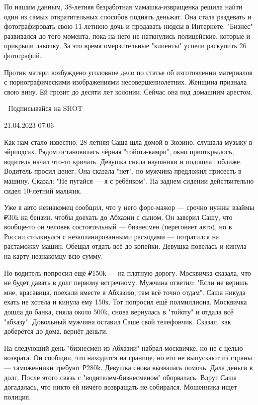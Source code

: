 \documentclass{article}
\begin{document}
\begin{multicols}{3}
По нашим данным, 38-летняя безработная мамашка-извращенка решила найти один из самых отвратительных способов поднять деньжат. Она стала раздевать и фотографировать свою 11-летнюю дочь и продавать нюдсы в Интернете. "Бизнес" развивался до того момента, пока на него не наткнулись полицейские, которые и прикрыли лавочку. За это время омерзительные "клиенты" успели раскупить 26 фотографий.

Против матери возбуждено уголовное дело по статье об изготовлении материалов с порнографическими изображениями несовершеннолетних. Женщина признала свою вину. Ей грозит до десяти лет колонии. Сейчас она под домашним арестом.

🎯 Подписывайся на SHOT

21.04.2023 07:06\closearticle
{}


Как нам стало известно, 28-летняя Саша шла домой в Зюзино, слушала музыку в эйрподсах. Рядом остановилась чёрная "тойота-камри", окно приоткрылось, водитель начал что-то кричать. Девушка сняла наушники и подошла поближе. Водитель просил денег. Она сказала "нет", но мужчина предложил присесть в машину. Сказал: "Не пугайся — я с ребёнком". На заднем сидении действительно сидел 10-летний мальчик. 

Уже в авто незнакомец сообщил, что у него форс-мажор — срочно нужны взаймы ₽30k на бензин, чтобы доехать до Абхазии с сыном. Он заверил Сашу, что вообще-то он человек состоятельный — бизнесмен (перегоняет авто), но в России столкнулся с незапланированными расходами — потратился на растаможку машин. Обещал отдать всё до копейки. Девушка повелась и кинула на карту незнакомцу всю сумму.

Но водитель попросил ещё ₽150k — на платную дорогу. Москвичка сказала, что не будет давать в долг первому встречному. Мужчина ответил: "Если не веришь мне, красавица, поехали вместе в Абхазию, там всё точно отдам". Саша никуда ехать не хотела и кинула ему 150к. Тот попросил ещё полмиллиона. Москвичка дошла до банка, сняла около 500k, снова вернулась в "тойоту" и отдала всё "абхазу". Довольный мужчина оставил Саше свой телефончик. Сказал, как доберётся до дома, вернёт деньги. 

На следующий день "бизнесмен из Абхазии" набрал москвичке, но не с целью возврата. Он сообщил, что находится на границе, но его не выпускают из страны — таможенники требуют ₽280k. Девушка снова вызвалась помочь. Дала деньги в долг. После этого связь с "водителем-бизнесменом" оборвалась. Вдруг Саша догадалась, что никто ей ничего возвращать не собирался. Мошенника ищет полиция.


\end{multicols}
\end{document}
